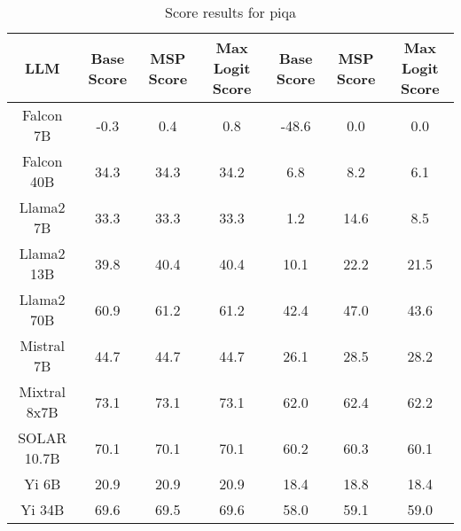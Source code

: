 \renewcommand\arraystretch{1.2}
\begin{table*}
\centering
\begin{tabular}{c|c|c|c|c|c|c}
LLM & Base Score & MSP Score & Max Logit Score & Base Score & MSP Score & Max Logit Score\\ \hline
Falcon 7B & -0.3 & 0.4 & 0.8 & -48.6 & 0.0 & 0.0\\
Falcon 40B & 34.3 & 34.3 & 34.2 & 6.8 & 8.2 & 6.1\\
Llama2 7B & 33.3 & 33.3 & 33.3 & 1.2 & 14.6 & 8.5\\
Llama2 13B & 39.8 & 40.4 & 40.4 & 10.1 & 22.2 & 21.5\\
Llama2 70B & 60.9 & 61.2 & 61.2 & 42.4 & 47.0 & 43.6\\
Mistral 7B & 44.7 & 44.7 & 44.7 & 26.1 & 28.5 & 28.2\\
Mixtral 8x7B & 73.1 & 73.1 & 73.1 & 62.0 & 62.4 & 62.2\\
SOLAR 10.7B & 70.1 & 70.1 & 70.1 & 60.2 & 60.3 & 60.1\\
Yi 6B & 20.9 & 20.9 & 20.9 & 18.4 & 18.8 & 18.4\\
Yi 34B & 69.6 & 69.5 & 69.6 & 58.0 & 59.1 & 59.0\\
\hline
\end{tabular}
\caption{Score results for piqa}
\end{table*}
\label{tab:piqa_score}
